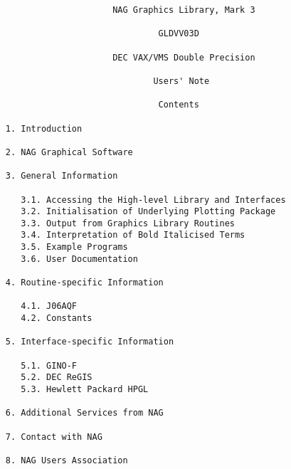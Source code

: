 \begin{verbatim}
                          NAG Graphics Library, Mark 3
              
                                   GLDVV03D
              
                          DEC VAX/VMS Double Precision
              
                                  Users' Note
              
                                   Contents

     1. Introduction
     
     2. NAG Graphical Software
     
     3. General Information
     
        3.1. Accessing the High-level Library and Interfaces
        3.2. Initialisation of Underlying Plotting Package
        3.3. Output from Graphics Library Routines
        3.4. Interpretation of Bold Italicised Terms
        3.5. Example Programs
        3.6. User Documentation
     
     4. Routine-specific Information
     
        4.1. J06AQF
        4.2. Constants
     
     5. Interface-specific Information
     
        5.1. GINO-F
        5.2. DEC ReGIS
        5.3. Hewlett Packard HPGL
     
     6. Additional Services from NAG
     
     7. Contact with NAG

     8. NAG Users Association
\end{verbatim}
\newpage
